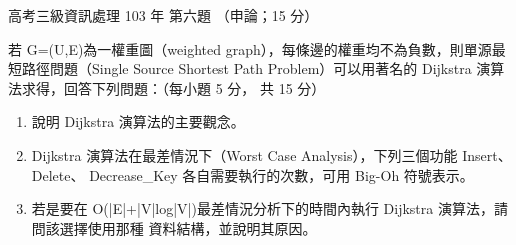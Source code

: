 \begin{pastexam}[label={px:gk3-103-ds-06}]{高考三級資訊處理 103 年 第六題}
（申論；15 分）

若 G=(U,E)為一權重圖（weighted graph），每條邊的權重均不為負數，則單源最短路徑問題（Single
Source Shortest Path Problem）可以用著名的 Dijkstra 演算法求得，回答下列問題：（每小題 5 分，
共 15 分）
\begin{enumerate}[leftmargin=2.2em]
\item[㈠] 說明 Dijkstra 演算法的主要觀念。
\item[㈡] Dijkstra 演算法在最差情況下（Worst Case Analysis），下列三個功能 Insert、Delete、
Decrease\_Key 各自需要執行的次數，可用 Big-Oh 符號表示。
\item[㈢] 若是要在 O(|E|+|V|log|V|)最差情況分析下的時間內執行 Dijkstra 演算法，請問該選擇使用那種
資料結構，並說明其原因。
\end{enumerate}
\end{pastexam}

